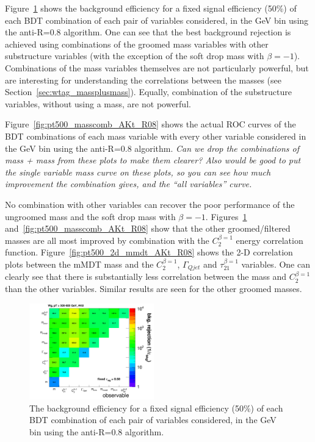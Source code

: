 Figure~\ref{fig:pt500_2Dcomb_AKt_R08} shows the background efficiency
for a fixed signal efficiency (50\%) of each BDT combination of
each pair of variables considered, in the  GeV bin using the anti-\kT R=0.8
algorithm. One can see that the best background rejection is achieved
using combinations of the groomed mass variables with other
substructure variables (with the exception
of the soft drop mass with $\beta=-1$). Combinations of the mass
variables themselves are not particularly powerful, but are
interesting for understanding the correlations between the masses (see
Section~\ref{sec:wtag_massplusmass}). Equally, combination of the
substructure variables, without using a mass, are not powerful. 

Figure~\ref{fig:pt500_masscomb_AKt_R08} shows the actual ROC curves of the BDT combinations of each mass variable with every other
variable considered in the  GeV bin using the anti-\kT R=0.8
algorithm. {\it Can we drop the combinations of mass + mass
from these plots to make them clearer? Also would be good to put the
single variable mass curve on these plots, so you can see how much
improvement the combination gives, and the ``all variables'' curve.}

No combination with other variables can recover the poor performance
of the ungroomed mass and the soft drop mass with
$\beta=-1$. Figures~\ref{fig:pt500_2Dcomb_AKt_R08}
and~\ref{fig:pt500_masscomb_AKt_R08} show that the
other groomed/filtered masses are all most improved by combination
with the $C_{2}^{\beta=1}$ energy correlation
function. Figure~\ref{fig:pt500_2d_mmdt_AKt_R08} shows the 2-D
correlation plots between the mMDT mass and the $C_{2}^{\beta=1}$,
$\Gamma_{Qjet}$ and $\tau_{21}^{\beta=1}$ variables. One can clearly
see that there is substantially less correlation between the mass and
$C_{2}^{\beta=1}$ than the other variables. Similar results are seen
for the other groomed masses.

\begin{figure}
\begin{center}
\includegraphics[width=0.48\textwidth]{./Figures/WTagging/pT500/AKtR08/effBkg2D.png}
\caption{The background efficiency
for a fixed signal efficiency (50\%) of each BDT combination of
each pair of variables considered, in the  GeV bin using the anti-\kT R=0.8
algorithm.}
\label{fig:pt500_2Dcomb_AKt_R08}
\end{center}
\end{figure}


